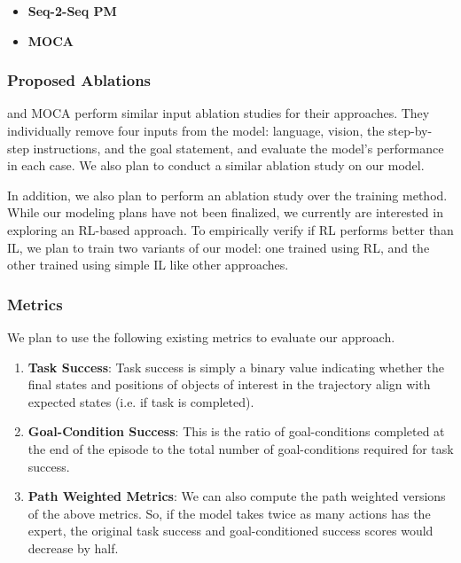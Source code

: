 \documentclass[11pt,a4paper]{article}
\begin{document}
\begin{itemize}
\item \textbf{Seq-2-Seq PM} \cite{shridhar2020alfred} 
\item \textbf{MOCA} \cite{singh2020moca}
\end{itemize}


\subsubsection{Proposed Ablations}
 and MOCA \cite{singh2020moca} perform similar input ablation studies for their approaches. They individually remove four inputs from the model: language, vision, the step-by-step instructions, and the goal statement, and evaluate the model's performance in each case. We also plan to conduct a similar ablation study on our model.

In addition, we also plan to perform an ablation study over the training method. While our modeling plans have not been finalized, we currently are interested in exploring an RL-based approach. To empirically verify if RL performs better than IL, we plan to train two variants of our model: one trained using RL, and the other trained using simple IL like other approaches.

\subsubsection{Metrics}
We plan to use the following existing metrics to evaluate our approach.
\begin{enumerate}
    \item \textbf{Task Success}: Task success is simply a binary value indicating whether the final states and positions of objects of interest in the trajectory align with expected states (i.e. if task is completed).
    \item \textbf{Goal-Condition Success}: This is the ratio of goal-conditions completed at the end of the episode to the total number of goal-conditions required for task success.
    \item \textbf{Path Weighted Metrics}: We can also compute the path weighted versions of the above metrics. So, if the model takes twice as many actions has the expert, the original task success and goal-conditioned success scores would decrease by half.
\end{enumerate}
\end{document}
